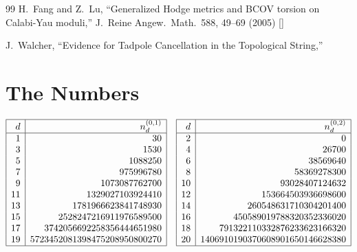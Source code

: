 \begin{thebibliography}{99}
H.~Fang and Z.~Lu,
``Generalized Hodge metrics and BCOV torsion on Calabi-Yau moduli,''
J.~Reine Angew.~Math.\ 588, 49--69 (2005)
[]

J.~Walcher,
``Evidence for Tadpole Cancellation in the Topological String,''






\end{thebibliography}



\appendix

\section{The Numbers}
\label{tables}

\bigskip

$$
\begin {array} {|r|r|}
\hline
d   & n^{(0,1)}_d \\\hline
1   & 30 \\
3   & 1530 \\
5   & 1088250 \\
7   & 975996780 \\
9   & 1073087762700 \\
11  & 1329027103924410 \\
13  & 1781966623841748930 \\
15  & 2528247216911976589500 \\
17  & 3742056692258356444651980 \\
19  & 5723452081398475208950800270 
\\\hline
\end {array}
\quad
\begin {array} {|r|r|}
\hline
d   & n^{(0,2)}_d \\\hline
2  & 0 \\
4  & 26700 \\
6  & 38569640 \\
8  & 58369278300 \\
10 & 93028407124632 \\
12 & 153664503936698600 \\
14 & 260548631710304201400 \\
16 & 450589019788320352336020 \\
18 & 791322110332876233623166320 \\
20 & 1406910190370608901650146628380
\\\hline
\end {array}
$$

